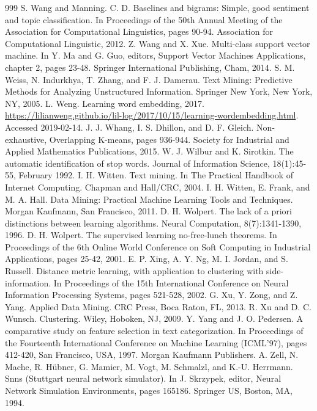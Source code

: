 \documentclass[11pt,openany,executivepaper]{book}
\begin{document}
\begin{thebibliography}{999}
 S. Wang and Manning. C. D. Baselines and bigrams: Simple, good sentiment and topic classification. In Proceedings of the 50th Annual Meeting of the Association for Computational Linguistics, pages 90-94. Association for Computational Linguistic, 2012.
 Z. Wang and X. Xue. Multi-class support vector machine. In Y. Ma and G. Guo, editors, Support Vector Machines Applications, chapter 2, pages 23-48. Springer International Publishing, Cham, 2014.
 S. M. Weiss, N. Indurkhya, T. Zhang, and F. J. Damerau. Text Mining: Predictive Methods for Analyzing Unstructured Information. Springer New York, New York, NY, 2005.
 L. Weng. Learning word embedding, 2017. \url{https://lilianweng.github.io/lil-log/2017/10/15/learning-wordembedding.html}. Accessed 2019-02-14.
 J. J. Whang, I. S. Dhillon, and D. F. Gleich. Non-exhaustive, Overlapping K-means, pages 936-944. Society for Industrial and Applied Mathematics Publications, 2015.
 W. J. Wilbur and K. Sirotkin. The automatic identification of stop words. Journal of Information Science, 18(1):45-55, February 1992.
 I. H. Witten. Text mining. In The Practical Handbook of Internet Computing. Chapman and Hall/CRC, 2004.
 I. H. Witten, E. Frank, and M. A. Hall. Data Mining: Practical Machine Learning Tools and Techniques. Morgan Kaufmann, San Francisco, 2011.
 D. H. Wolpert. The lack of a priori distinctions between learning algorithms. Neural Computation, 8(7):1341-1390, 1996.
 D. H. Wolpert. The supervised learning no-free-lunch theorems. In Proceedings of the 6th Online World Conference on Soft Computing in Industrial Applications, pages 25-42, 2001.
 E. P. Xing, A. Y. Ng, M. I. Jordan, and S. Russell. Distance metric learning, with application to clustering with side-information. In Proceedings of the 15th International Conference on Neural Information Processing Systems, pages 521-528, 2002.
 G. Xu, Y. Zong, and Z. Yang. Applied Data Mining. CRC Press, Boca Raton, FL, 2013.
 R. Xu and D. C. Wunsch. Clustering. Wiley, Hoboken, NJ, 2009.
 Y. Yang and J. O. Pedersen. A comparative study on feature selection in text categorization. In Proceedings of the Fourteenth International Conference on Machine Learning (ICML'97), pages 412-420, San Francisco, USA, 1997. Morgan Kaufmann Publishers.
 A. Zell, N. Mache, R. Hübner, G. Mamier, M. Vogt, M. Schmalzl, and K.-U. Herrmann. Snns (Stuttgart neural network simulator). In J. Skrzypek, editor, Neural Network Simulation Environments, pages 165186. Springer US, Boston, MA, 1994.

\end{thebibliography}
\end{document}
